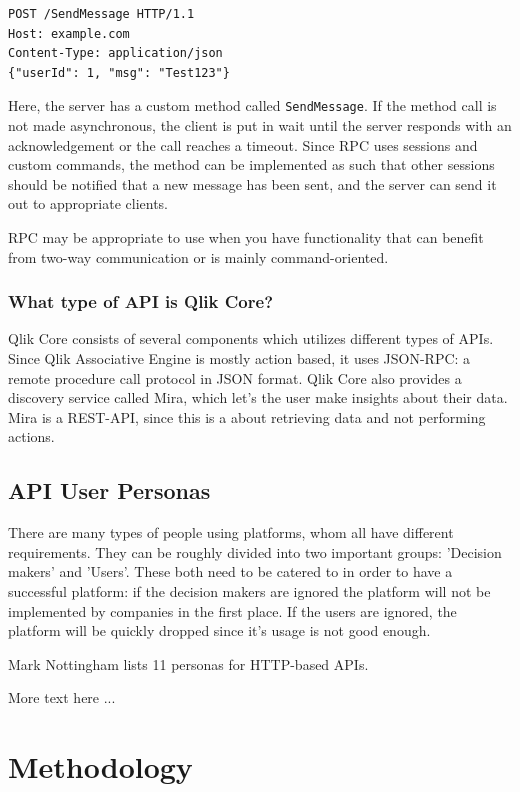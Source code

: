 \documentclass{article}
\begin{document}
\begin{lstlisting}
POST /SendMessage HTTP/1.1
Host: example.com
Content-Type: application/json
{"userId": 1, "msg": "Test123"}
\end{lstlisting}

Here, the server has a custom method called \texttt{SendMessage}. If the
method call is not made asynchronous, the client is put in wait until
the server responds with an acknowledgement or the call reaches a
timeout. Since RPC uses sessions and custom commands, the method can be
implemented as such that other sessions should be notified that a new
message has been sent, and the server can send it out to appropriate
clients.

RPC may be appropriate to use when you have functionality that can
benefit from two-way communication or is mainly command-oriented.

\subsubsection{What type of API is Qlik Core?}

Qlik Core consists of several components which utilizes different types
of APIs. Since Qlik Associative Engine is mostly action based, it uses
JSON-RPC: a remote procedure call protocol in JSON format. Qlik Core
also provides a discovery service called Mira, which let's the user make
insights about their data. Mira is a REST-API, since this is a about
retrieving data and not performing actions.\cite{qlikwebsite}

\subsection{API User Personas}

There are many types of people using platforms, whom all have different
requirements. They can be roughly divided into two important groups:
'Decision makers' and 'Users'. These both need to be catered to in order
to have a successful platform: if the decision makers are ignored the
platform will not be implemented by companies in the first place. If the
users are ignored, the platform will be quickly dropped since it's usage
is not good enough.

Mark Nottingham lists 11 personas for HTTP-based APIs\cite{personas}.

More text here ...

\section{Methodology}
\end{document}
